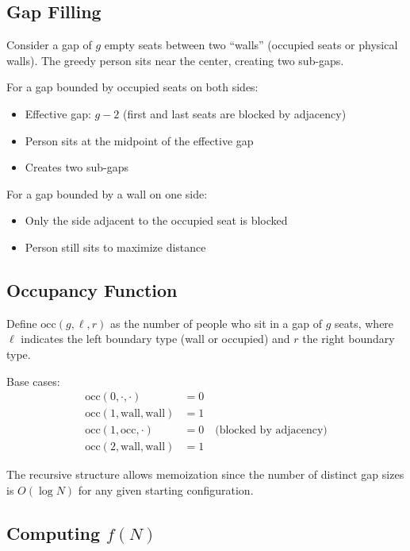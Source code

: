 \documentclass[11pt]{article}
\begin{document}
\subsection{Gap Filling}

Consider a gap of $g$ empty seats between two ``walls'' (occupied seats or physical walls).
The greedy person sits near the center, creating two sub-gaps.

For a gap bounded by occupied seats on both sides:
\begin{itemize}
\item Effective gap: $g - 2$ (first and last seats are blocked by adjacency)
\item Person sits at the midpoint of the effective gap
\item Creates two sub-gaps
\end{itemize}

For a gap bounded by a wall on one side:
\begin{itemize}
\item Only the side adjacent to the occupied seat is blocked
\item Person still sits to maximize distance
\end{itemize}

\subsection{Occupancy Function}

Define $\text{occ}(g, \ell, r)$ as the number of people who sit in a gap of $g$ seats, where $\ell$ indicates the left boundary type (wall or occupied) and $r$ the right boundary type.

Base cases:
\begin{align}
\text{occ}(0, \cdot, \cdot) &= 0 \\
\text{occ}(1, \text{wall}, \text{wall}) &= 1 \\
\text{occ}(1, \text{occ}, \cdot) &= 0 \quad \text{(blocked by adjacency)} \\
\text{occ}(2, \text{wall}, \text{wall}) &= 1
\end{align}

The recursive structure allows memoization since the number of distinct gap sizes is $O(\log N)$ for any given starting configuration.

\subsection{Computing $f(N)$}
\end{document}
